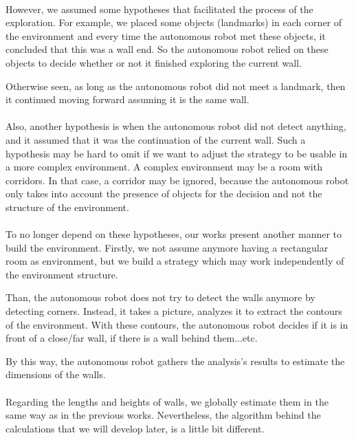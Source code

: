 \documentclass[12pt]{report}
\begin{document}
	\paragraph{}
	However, we assumed some hypotheses that facilitated the process of the exploration. For example, we placed some objects (landmarks) in each corner of the environment and every time the autonomous robot met these objects, it concluded that this was a wall end. So the autonomous robot relied on these objects to decide whether or not it finished exploring the current wall.
	
	Otherwise seen, as long as the autonomous robot did not meet a landmark, then it continued moving forward assuming it is the same wall.
	
	\paragraph{}
	Also, another hypothesis is when the autonomous robot did not detect anything, and it assumed that it was the continuation of the current wall. Such a hypothesis may be hard to omit if we want to adjust the strategy to be usable in a more complex environment. A complex environment may be a room with corridors. In that case, a corridor may be ignored, because the autonomous robot only takes into account the presence of objects for the decision and not the structure of the environment.
	
	\paragraph{}
	To no longer depend on these hypotheses, our works present another manner to build the environment. Firstly, we not assume anymore having a rectangular room as environment, but we build a strategy which may work independently of the environment structure. 
	
	Than, the autonomous robot does not try to detect the walls anymore by detecting corners. Instead, it takes a picture, analyzes it to extract the contours of the environment. With these contours, the autonomous robot decides if it is in front of a close/far wall, if there is a wall behind them...etc.
	
	By this way, the autonomous robot gathers the analysis's results to estimate the dimensions of the walls.
	
	\paragraph{}
	Regarding the lengths and heights of walls, we globally estimate them in the same way as in the previous works. Nevertheless, the algorithm behind the calculations that we will develop later, is a little bit different. 
\end{document}
